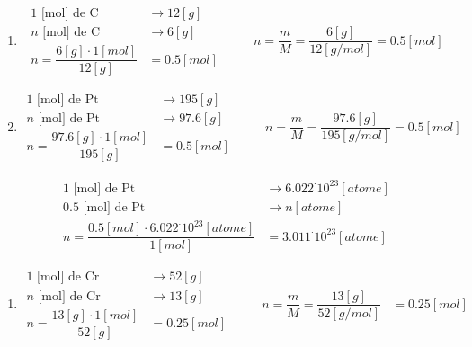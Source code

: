 \documentclass[
  11pt,
  french,
  a4paper,
  openany]{book}
\providecommand{\tightlist}{%
  \setlength{\itemsep}{0pt}\setlength{\parskip}{0pt}}
\begin{document}
\begin{Answer}

\begin{enumerate}
\def\labelenumi{\arabic{enumi}.}
\item
  \[ \begin{split}
           1 \text{ [mol] de C } &\longrightarrow 12 [g]\\
           n \text{ [mol] de C } &\longrightarrow 6 [g]\\
           n = \dfrac{6 [g] \cdot 1 [mol]}{12 [g]} &= 0.5 [mol]
       \end{split}
       \qquad
       \begin{split}
       n = \dfrac{m}{M} = \dfrac{6[g]}{12[g/mol]} = 0.5 [mol]
   \end{split} \]
\item
  \[ \begin{split}
           1 \text{ [mol] de Pt } &\longrightarrow 195 [g]\\
           n \text{ [mol] de Pt } &\longrightarrow 97.6 [g]\\
           n = \dfrac{97.6 [g] \cdot 1 [mol]}{195 [g]} &= 0.5 [mol]
       \end{split}
       \qquad
       \begin{split}
       n = \dfrac{m}{M} = \dfrac{97.6[g]}{195[g/mol]} = 0.5 [mol]
   \end{split} \]
\end{enumerate}

\[ \begin{split}
  1 \text{ [mol] de Pt } &\longrightarrow 6.022^\cdot10^{23} [atome]\\
  0.5 \text{ [mol] de Pt } &\longrightarrow n [atome]\\
  n = \dfrac{0.5 [mol] \cdot 6.022^\cdot10^{23} [atome]}{1 [mol]} &= 3.011^\cdot10^{23} [atome]
  \end{split} \]

\begin{enumerate}
\def\labelenumi{\arabic{enumi}.}
\setcounter{enumi}{2}
\tightlist
\item
  \[ \begin{split}
       1 \text{ [mol] de Cr } &\longrightarrow 52 [g]\\
       n \text{ [mol] de Cr } &\longrightarrow 13 [g]\\
       n = \dfrac{13 [g] \cdot 1 [mol]}{52 [g]} &= 0.25 [mol]
       \end{split}
       \qquad
       \begin{split}
       n = \dfrac{m}{M} = \dfrac{13[g]}{52[g/mol]} &= 0.25 [mol]
   \end{split} \]
\end{enumerate}


\end{Answer}
\end{document}
